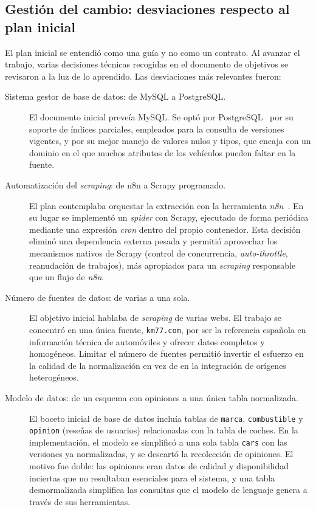 \subsection{Gestión del cambio: desviaciones respecto al plan inicial}
\label{sec:met-desviaciones}

El plan inicial se entendió como una guía y no como un contrato. Al avanzar el
trabajo, varias decisiones técnicas recogidas en el documento de objetivos se
revisaron a la luz de lo aprendido. Las desviaciones más relevantes fueron:

\begin{description}
  \item[Sistema gestor de base de datos: de MySQL a PostgreSQL.] El documento
        inicial preveía MySQL. Se optó por PostgreSQL~\cite{postgresql2024} por su soporte de índices
        parciales, empleados para la consulta de versiones vigentes, y por su
        mejor manejo de valores nulos y tipos, que encaja con un dominio en el que
        muchos atributos de los vehículos pueden faltar en la fuente.

  \item[Automatización del \emph{scraping}: de n8n a Scrapy programado.] El plan
        contemplaba orquestar la extracción con la herramienta \emph{n8n}~\cite{n8n2024}. En su
        lugar se implementó un \emph{spider} con Scrapy, ejecutado de forma
        periódica mediante una expresión \emph{cron} dentro del propio contenedor.
        Esta decisión eliminó una dependencia externa pesada y permitió aprovechar
        los mecanismos nativos de Scrapy (control de concurrencia,
        \emph{auto-throttle}, reanudación de trabajos), más apropiados para un
        \emph{scraping} responsable que un flujo de \emph{n8n}.

  \item[Número de fuentes de datos: de varias a una sola.] El objetivo inicial
        hablaba de \emph{scraping} de varias webs. El trabajo se concentró en una
        única fuente, \texttt{km77.com}, por ser la referencia española en
        información técnica de automóviles y ofrecer datos completos y homogéneos.
        Limitar el número de fuentes permitió invertir el esfuerzo en la calidad
        de la normalización en vez de en la integración de orígenes heterogéneos.

  \item[Modelo de datos: de un esquema con opiniones a una única tabla
        normalizada.] El boceto inicial de base de datos incluía tablas de
        \texttt{marca}, \texttt{combustible} y \texttt{opinion} (reseñas de
        usuarios) relacionadas con la tabla de coches. En la implementación, el
        modelo se simplificó a una sola tabla \texttt{cars} con las versiones ya
        normalizadas, y se descartó la recolección de opiniones. El motivo fue
        doble: las opiniones eran datos de calidad y disponibilidad inciertas que
        no resultaban esenciales para el sistema, y una tabla desnormalizada
        simplifica las consultas que el modelo de lenguaje genera a través de sus
        herramientas.


\end{description}
